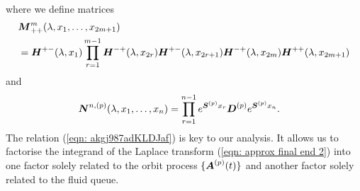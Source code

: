 \begin{align}
	 \label{eqn: approx final end 2}
\end{align}
where we define matrices 
\begin{align}
	&\boldsymbol M^{m}_{++}(\lambda,x_1,\dots,x_{2m+1}) \nonumber 
	\\&= \boldsymbol H^{+-}(\lambda,x_1)\prod_{r=1}^{m-1}\boldsymbol H^{-+}(\lambda,x_{2r}) \boldsymbol H^{+-}(\lambda,x_{2r+1}) \boldsymbol H^{-+}(\lambda,x_{2m}) 
	\boldsymbol H^{++}(\lambda,x_{2m+1})\nonumber 
\end{align}
and
\begin{align}
	\boldsymbol N^{n,(p)}(\lambda,x_1,\dots,x_{n}) &= \prod_{r=1}^{n-1} e^{\boldsymbol{S}^{(p)}x_{r}}\boldsymbol{D}^{(p)} e^{\boldsymbol{S}^{(p)}x_{n}}. \nonumber 
\end{align}
The relation (\ref{eqn: akgj987adKLDJaf}) is key to our analysis. It allows us to factorise the integrand of the Laplace transform (\ref{eqn: approx final end 2}) into one factor solely related to the orbit process \(\{\boldsymbol A^{(p)}(t)\}\) and another factor solely related to the fluid queue. 

